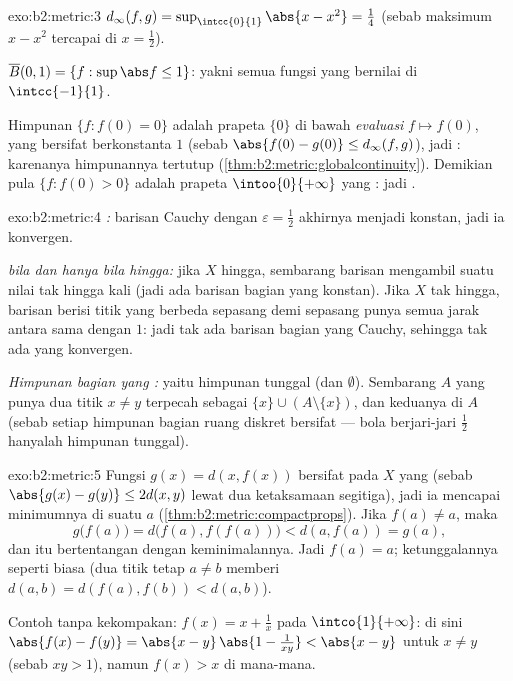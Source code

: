 \begin{solution}{exo:b2:metric:3}
$d_\infty(f, g) = \sup_{\intcc{0}{1}} \abs{x - x^2} = \frac14$
(sebab maksimum $x - x^2$ tercapai di $x = \frac12$).

$\overline B(0, 1) = \{f : \sup\abs f \leq 1\}$: yakni semua fungsi
 yang bernilai di $\intcc{-1}{1}$.

Himpunan $\{f : f(0) = 0\}$ adalah prapeta $\{0\}$ di bawah
\emph{evaluasi} $f \mapsto f(0)$, yang bersifat  berkonstanta
$1$ (sebab $\abs{f(0) - g(0)} \leq d_\infty(f,g)$), jadi :
karenanya himpunannya tertutup
(\cref{thm:b2:metric:globalcontinuity}). Demikian pula $\{f :
f(0) > 0\}$ adalah prapeta $\intoo{0}{+\infty}$ yang : jadi .
\end{solution}

\begin{solution}{exo:b2:metric:4}
\emph{:} barisan Cauchy dengan $\varepsilon = \frac12$ akhirnya
menjadi konstan, jadi ia konvergen.

\emph{ bila dan hanya bila hingga:} jika $X$ hingga, sembarang
barisan mengambil suatu nilai tak hingga kali (jadi ada barisan bagian
yang konstan). Jika $X$ tak hingga, barisan berisi titik yang berbeda
sepasang demi sepasang punya semua jarak antara sama dengan $1$: jadi tak
ada barisan bagian yang Cauchy, sehingga tak ada yang konvergen.

\emph{Himpunan bagian yang :} yaitu himpunan tunggal (dan
$\emptyset$). Sembarang $A$ yang punya dua titik $x \neq y$ terpecah
sebagai $\{x\} \cup (A \setminus\{x\})$, dan keduanya  di $A$
(sebab setiap himpunan bagian ruang diskret bersifat  --- bola
berjari-jari $\frac12$ hanyalah himpunan tunggal).
\end{solution}

\begin{solution}{exo:b2:metric:5}
Fungsi $g(x) = d(x, f(x))$ bersifat  pada $X$ yang 
(sebab $\abs{g(x) - g(y)} \leq 2d(x,y)$ lewat dua ketaksamaan segitiga),
jadi ia mencapai minimumnya di suatu $a$
(\cref{thm:b2:metric:compactprops}). Jika $f(a) \neq a$, maka
\[
g\bigl(f(a)\bigr) = d\bigl(f(a), f(f(a))\bigr) < d(a, f(a)) = g(a),
\]
dan itu bertentangan dengan keminimalannya. Jadi $f(a) = a$;
ketunggalannya seperti biasa (dua titik tetap $a \neq b$ memberi $d(a,b)
= d(f(a), f(b)) < d(a,b)$).

Contoh tanpa kekompakan: $f(x) = x + \frac1x$ pada $\intco{1}{+\infty}$:
di sini $\abs{f(x) - f(y)} = \abs{x - y}\,\abs{1 - \frac{1}{xy}} < \abs{x
- y}$ untuk $x \neq y$ (sebab $xy > 1$), namun $f(x) > x$ di mana-mana.
\end{solution}

